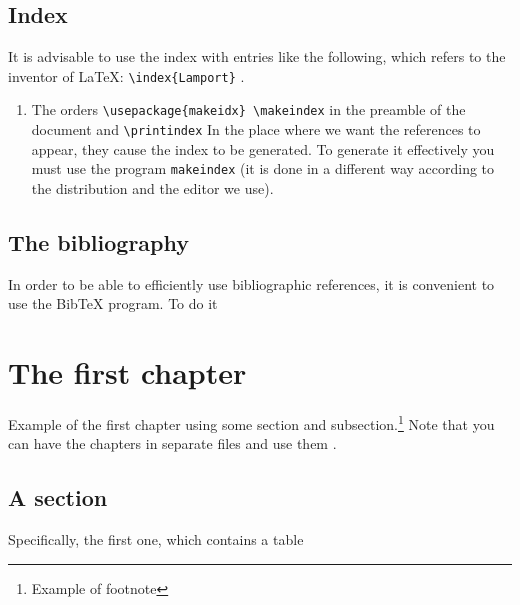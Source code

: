 \documentclass[12pt, b5paper,twoside]{tesi_upf}
\begin{document}
\section*{Index}

It is advisable to use the index with entries like the following, which refers to the inventor of \LaTeX:  \verb+\index{Lamport}+ . 
\begin{enumerate}
\item The orders \verb+\usepackage{makeidx} \makeindex+ in the preamble of the document and \verb+\printindex+ In the place where we want the references to appear, they cause the index to be generated. To generate it effectively you must use the program \verb+makeindex+ (it is done in a different way according to the distribution and the editor we use).
\end{enumerate}

\section*{The bibliography}
In order to be able to efficiently use bibliographic references, it is convenient to use the BibTeX program. To do it 




\chapter{The first chapter}
Example of the first chapter using some section and subsection.\footnote{Example of footnote} Note that you can have the chapters in separate files and use them \verb++.


\section{A section}
Specifically, the first one, which contains a table
\end{document}
